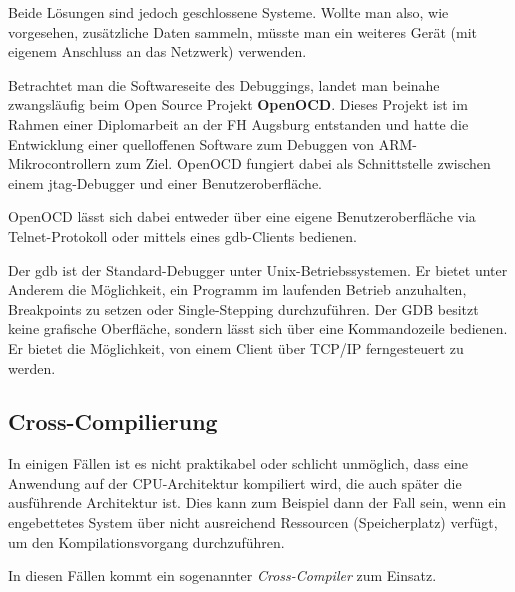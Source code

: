 Beide Lösungen sind jedoch geschlossene Systeme. Wollte man also, wie
vorgesehen, zusätzliche Daten sammeln, müsste man ein weiteres Gerät (mit
eigenem Anschluss an das Netzwerk) verwenden.

Betrachtet man die Softwareseite des Debuggings, landet man beinahe
zwangsläufig beim Open Source Projekt \textbf{OpenOCD}. Dieses Projekt ist im
Rahmen einer Diplomarbeit\cite{OOCD2} an der FH Augsburg entstanden und hatte
die Entwicklung einer quelloffenen Software zum Debuggen von
ARM-Mikrocontrollern zum Ziel. OpenOCD fungiert dabei als Schnittstelle zwischen
einem \gls{jtag}-Debugger und einer Benutzeroberfläche.

OpenOCD lässt sich dabei entweder über eine eigene Benutzeroberfläche via
Telnet-Protokoll oder mittels eines \gls{gdb}-Clients bedienen.
\begin{definition}[GDB]
Der \gls{gdb} ist der Standard-Debugger unter
Unix-Betriebssystemen. Er bietet unter Anderem die Möglichkeit, ein Programm im
laufenden Betrieb anzuhalten, Breakpoints zu setzen oder Single-Stepping
durchzuführen. Der GDB besitzt keine grafische Oberfläche, sondern
lässt sich über eine Kommandozeile bedienen. Er bietet die Möglichkeit, von
einem Client über TCP/IP ferngesteuert zu werden. 
\end{definition}
\subsection{Cross-Compilierung}
In einigen Fällen ist es nicht praktikabel oder schlicht unmöglich, dass eine
Anwendung auf der CPU-Architektur kompiliert wird, die auch später die
ausführende Architektur ist. Dies kann zum Beispiel dann der Fall sein, wenn ein
engebettetes System über nicht ausreichend Ressourcen (Speicherplatz) verfügt,
um den Kompilationsvorgang durchzuführen.

In diesen Fällen kommt ein sogenannter \emph{Cross-Compiler} zum Einsatz.
